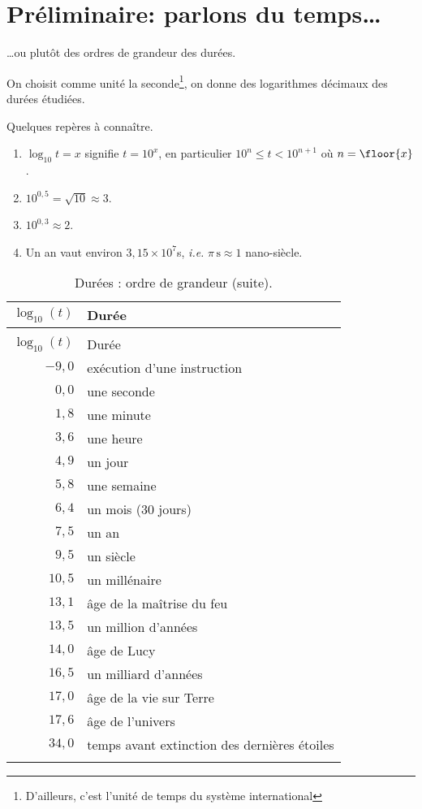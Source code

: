 \section{Préliminaire: parlons du temps\ldots{}}

\ldots{}ou plutôt des ordres de grandeur des durées.

On choisit comme unité la seconde\footnote{D'ailleurs, c'est l'unité de temps du système international}, on donne des logarithmes décimaux des durées étudiées.

Quelques repères à connaître.
\begin{enumerate}
\item  $\log_{10} t = x$ signifie $t = 10^{x}$, en particulier
$10^{n}\leq t < 10^{n+1}$ où $n = \floor{x}$.
\item $10^{0,5} = \sqrt{10} \approx 3$.
\item $10^{0,3} \approx 2$.
\item Un an vaut environ $3,15\times 10^{7}$s, \emph{i.e.} $\pi \,\mathrm{s} \approx 1$ nano-siècle.
\end{enumerate}

\begin{longtable}{rl}
  \caption{Durées : ordre de grandeur ($t$ en secondes).}\\
  \toprule{}
  $\log_{10}(t)$ & Durée\\
  \midrule
   \endfirsthead
   \caption{Durées : ordre de grandeur (suite).}\\
   \toprule{}
  $\log_{10}(t)$ & Durée\\
  \midrule
   \endhead
  $-9,0$ & exécution d'une instruction\\
  $0,0$ & une seconde\\
  $1,8$ & une minute \\
  $3,6$ & une heure\\
  $4,9$ & un jour\\
  $5,8$ & une semaine\\
  $6,4$ & un mois (30 jours)\\
  $7,5$ & un an\\
  $9,5$ & un siècle\\
  $10,5$ & un millénaire\\
  $13,1$ & âge de la maîtrise du feu\\
  $13,5$ & un million d'années\\
  $14,0$ & âge de Lucy\\
  $16,5$ & un milliard d'années\\
  $17,0$ & âge de la vie sur Terre\\
  $17,6$ & âge de l'univers\\
  $34,0$ & temps avant extinction des dernières étoiles\\
\bottomrule{}
\end{longtable}

